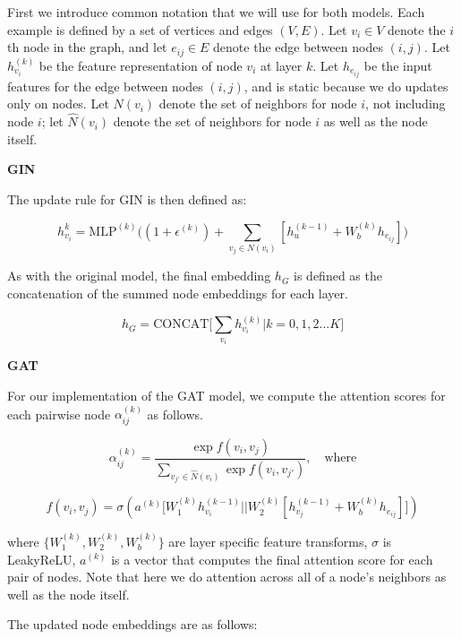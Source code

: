 \documentclass[letterpaper]{article} \usepackage{aaai22}  \usepackage{times}  \usepackage{helvet}  \usepackage{courier}  \usepackage[hyphens]{url}  \usepackage{graphicx} \urlstyle{rm} \def\UrlFont{\rm}  \usepackage{natbib}  \usepackage{caption} \DeclareCaptionStyle{ruled}{labelfont=normalfont,labelsep=colon,strut=off} \frenchspacing  \setlength{\pdfpagewidth}{8.5in}  \setlength{\pdfpageheight}{11in}  \usepackage{algorithm}
\begin{document}
First we introduce common notation that we will use for both models. Each example is defined by a set of vertices and edges $(V, E)$. Let $v_i \in V$ denote the $i$th node in the graph, and let $e_{ij} \in E$ denote the edge between nodes $(i, j)$. Let $h_{v_i}^{(k)}$ be the feature representation of node $v_i$ at layer $k$. Let $h_{e_{ij}}$ be the input features for the edge between nodes $(i, j)$, and is static because we do updates only on nodes. Let $N(v_i)$ denote the set of neighbors for node $i$, not including node $i$; let $\hat{N}(v_i)$ denote the set of neighbors for node $i$ as well as the node itself.

\textbf{GIN} 

The update rule for GIN is then defined as:

\begin{equation}
    h_{v_i}^k = \text{MLP}^{(k)} \big( (1+\epsilon^{(k)}) + \sum_{v_j \in N(v_i)} [h^{(k-1)}_u + W_b^{(k)} h_{e_{ij}}] \big) 
\end{equation}

As with the original model, the final embedding $h_G$ is defined as the concatenation of the summed node embeddings for each layer.

\begin{equation}
    h_G = \text{CONCAT}\Big[ \sum_{v_i} h_{v_i}^{(k)} | k = 0, 1, 2 ... K \Big]
\end{equation}

\textbf{GAT}

For our implementation of the GAT model, we compute the attention scores for each pairwise node $\alpha^{(k)}_{ij}$ as follows.

\begin{equation}
\alpha^{(k)}_{ij} = \frac{\exp f(v_i, v_j)}{\sum_{v_{j'} \in \hat{N}(v_i)} \exp f(v_i, v_{j'}) }, \quad \text{where}
\end{equation}

\begin{equation*}
    f(v_i, v_j) = \sigma(a^{(k)} \Big[W_1^{(k)} h_{v_i}^{(k-1)} || W_2^{(k)} [h_{v_j}^{(k-1)} + W_b^{(k)} h_{e_{ij}} ]\Big])
\end{equation*}

where $\{W_1^{(k)}, W_2^{(k)}, W_b^{(k)}\}$ are layer specific feature transforms, $\sigma$ is LeakyReLU, $a^{(k)}$ is a vector that computes the final attention score for each pair of nodes. Note that here we do attention across all of a node's neighbors as well as the node itself.

The updated node embeddings are as follows:
\end{document}
